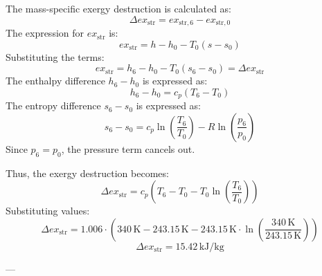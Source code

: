 The mass-specific exergy destruction is calculated as:  
\[
\Delta ex_{\text{str}} = ex_{\text{str},6} - ex_{\text{str},0}
\]  
The expression for \( ex_{\text{str}} \) is:  
\[
ex_{\text{str}} = h - h_0 - T_0 (s - s_0)
\]  
Substituting the terms:  
\[
ex_{\text{str}} = h_6 - h_0 - T_0 (s_6 - s_0) = \Delta ex_{\text{str}}
\]  
The enthalpy difference \( h_6 - h_0 \) is expressed as:  
\[
h_6 - h_0 = c_p (T_6 - T_0)
\]  
The entropy difference \( s_6 - s_0 \) is expressed as:  
\[
s_6 - s_0 = c_p \ln \left( \frac{T_6}{T_0} \right) - R \ln \left( \frac{p_6}{p_0} \right)
\]  
Since \( p_6 = p_0 \), the pressure term cancels out.  

Thus, the exergy destruction becomes:  
\[
\Delta ex_{\text{str}} = c_p (T_6 - T_0 - T_0 \ln \left( \frac{T_6}{T_0} \right))
\]  
Substituting values:  
\[
\Delta ex_{\text{str}} = 1.006 \cdot (340 \, \text{K} - 243.15 \, \text{K} - 243.15 \, \text{K} \cdot \ln \left( \frac{340 \, \text{K}}{243.15 \, \text{K}} \right))
\]  
\[
\Delta ex_{\text{str}} = 15.42 \, \text{kJ/kg}
\]  

---